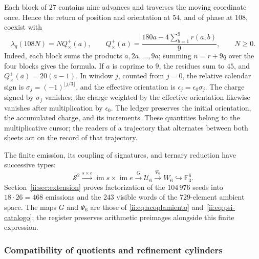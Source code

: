 Each block of \(27\) contains nine advances and traverses the
moving coordinate once. Hence the return of position and orientation
at \(54\), and of phase at \(108\), coexist with
\begin{equation}
 \lambda_q(108N)=NQ_\times^+(a),\qquad
 Q_\times^+(a)=\frac{180a-4\sum_{b=1}^9r(a,b)}9,
 \qquad N\geq0.
 \label{ii:prd-arit:retorno}
\end{equation}
Indeed, each block sums the products \(a,2a,\ldots,9a\);
summing \(n=r+9q\) over the four blocks gives the formula. If
\(a\) is coprime to \(9\), the residues sum to \(45\), and
\(Q_\times^+(a)=20(a-1)\). In window \(j\), counted from
\(j=0\), the relative calendar sign is
\(\sigma_j=(-1)^{\lfloor j/3\rfloor}\), and the effective
orientation is \(\epsilon_j=\epsilon_0\sigma_j\).
The charge signed by \(\sigma_j\) vanishes; the charge weighted
by the effective orientation likewise vanishes after multiplication by
\(\epsilon_0\). The ledger preserves the initial orientation, the accumulated
charge, and its increments. These quantities belong
to the multiplicative cursor; the readers of a trajectory that
alternates between both sheets act on the record of that trajectory.



The finite emission, its coupling of signatures, and ternary reduction have
successive types:
\[
 \mathcal S^2\xrightarrow{s\times e}
 \operatorname{im}s\times\operatorname{im}e
 \xrightarrow{G}\mathcal U_6
 \xrightarrow{\Psi_6}W_6\hookrightarrow\mathbb F_3^6.
\]
Section~\ref{ii:sec:extension} proves factorization of the \(104\,976\) seeds into \(18\cdot26=468\) emissions and the \(243\) visible words of the \(729\)-element ambient space. The maps \(G\) and \(\Psi_6\) are those of \eqref{ii:eq:acoplamiento} and~\eqref{ii:eq:psi-catalogo}; the register preserves arithmetic preimages alongside this finite expression.

\subsubsection{Compatibility of quotients and refinement cylinders}


